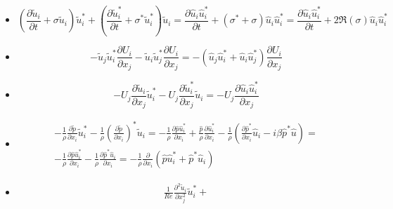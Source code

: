 \begin{itemize}
  \item
  \begin{equation}
    \left( \frac{\partial \tilde{u}_i}{\partial t} + \sigma \tilde{u}_i \right) \tilde{u}_i^* +
    \left( \frac{\partial \tilde{u}_i^*}{\partial t} + \sigma^* \tilde{u}^*_i \right) \tilde{u}_i = 
    \frac{\partial \hat{u}_i \hat{u}^*_i}{\partial t} + ( \sigma^* + \sigma ) \hat{u}_i \hat{u}_i^* = 
    \frac{\partial \hat{u}_i \hat{u}^*_i}{\partial t} + 2 \Re(\sigma) \hat{u}_i \hat{u}_i^* 
  \end{equation}
  \item
  \begin{equation}
    - \tilde{u}_j \tilde{u}_i^* \frac{\partial U_i}{\partial x_j} - 
      \tilde{u}_i \tilde{u}_j^* \frac{\partial U_i}{\partial x_j} = - ( \hat{u}_j \hat{u}_i^* + \hat{u}_i \hat{u}_j^* ) \frac{\partial U_i}{\partial x_j}
  \end{equation}
  \item
  \begin{equation}
    - U_j \frac{\partial \tilde{u}_i}{\partial x_j} \tilde{u}_i^* - U_j \frac{\partial \tilde{u}_i^*}{\partial x_j} \tilde{u}_i = 
    - U_j \frac{\partial \hat{u}_i \hat{u}_i^*}{\partial x_j}
  \end{equation}
  \item
  \begin{equation}
  \begin{gathered}
    - \frac{1}{\rho} \frac{\partial \tilde{p}}{\partial x_i} \tilde{u}_i^* - 
      \frac{1}{\rho} \left( \frac{\partial \tilde{p}}{\partial x_i} \right)^* \tilde{u}_i = 
    - \frac{1}{\rho} \frac{\partial \hat{p} \hat{u}_i^*}{\partial x_i} + \frac{\hat{p}}{\rho} \frac{\partial \hat{u}_i^*}{\partial x_i} - 
    \frac{1}{\rho} \left( \frac{\partial \hat{p}^*}{\partial x_i} \hat{u}_i - i \beta \hat{p}^* \hat{u} \right) = \\
    - \frac{1}{\rho} \frac{\partial \hat{p} \hat{u}_i^*}{\partial x_i} -
      \frac{1}{\rho} \frac{\partial \hat{p}^* \hat{u}_i}{\partial x_i} = 
      - \frac{1}{\rho} \frac{\partial}{\partial x_i} \left(  \hat{p} \hat{u}_i^* + \hat{p}^* \hat{u}_i \right)
  \end{gathered}
  \end{equation}
  \item 
  \begin{equation}
  \begin{gathered}
    \frac{1}{Re} \frac{\partial^2 \tilde{u}_i}{\partial x_j^2} \tilde{u}_i^* +

\end{gathered}
\end{equation}
\end{itemize}
